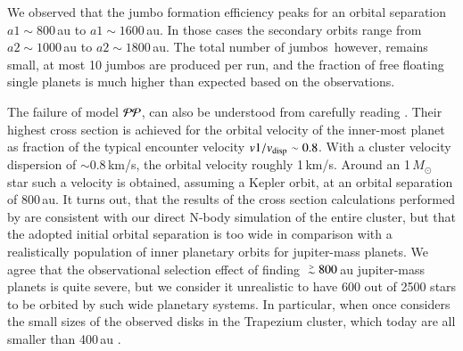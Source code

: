 \documentclass[aa]{aa}
\newcommand{\MSun}{\mbox{${M}_\odot$}}
\def\apgt{\ {\raise-.5ex\hbox{$\buildrel>\over\sim$}}\ }
\begin{document}
We observed that the jumbo formation efficiency peaks for an orbital
separation $a1 \sim 800$\,au to $a1 \sim 1600$\,au. In those cases the
secondary orbits range from $a2 \sim 1000$\,au to $a2 \sim 1800$\,au.
The total number of jumbos\, however, remains small, at most 10 jumbos
are produced per run, and the fraction of free floating single planets
is much higher than expected based on the observations.

The failure of model ${\cal PP}$, can also be understood from
carefully reading \cite{2023arXiv231006016W}. Their highest cross
section is achieved for the orbital velocity of the inner-most planet
as fraction of the typical encounter velocity $v1/v_{\rm disp} \sim
0.8$. With a cluster velocity dispersion of $\sim 0.8$\,km/s, the
orbital velocity roughly 1\,km/s. Around an 1\,\MSun\, star such a
velocity is obtained, assuming a Kepler orbit, at an orbital
separation of 800\,au. It turns out, that the results of the cross
section calculations performed by \cite{2023arXiv231006016W} are
consistent with our direct N-body simulation of the entire cluster,
but that the adopted initial orbital separation is too wide in
comparison with a realistically population of inner planetary orbits
for jupiter-mass planets.  We agree that the observational selection
effect of finding $\apgt 800$\,au jupiter-mass planets is quite
severe, but we consider it unrealistic to have 600 out of 2500 stars
to be orbited by such wide planetary systems. In particular, when once
considers the small sizes of the observed disks in the Trapezium
cluster, which today are all smaller than 400\,au
\citep{2005A&A...441..195V}.
\end{document}
